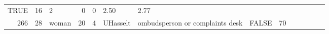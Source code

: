 \documentclass[]{svmono}
\theoremstyle{definition}
\theoremstyle{definition}
\theoremstyle{definition}
\theoremstyle{remark}
\begin{document}
\begin{longtable}[]{@{}rrlrrlllrrrrrr@{}}
\begin{minipage}[t]{0.04\columnwidth}
TRUE\strut
\end{minipage} & \begin{minipage}[t]{0.02\columnwidth}\raggedleft\strut
16\strut
\end{minipage} & \begin{minipage}[t]{0.03\columnwidth}\raggedleft\strut
2\strut
\end{minipage} & \begin{minipage}[t]{0.05\columnwidth}\raggedleft\strut
0\strut
\end{minipage} & \begin{minipage}[t]{0.06\columnwidth}\raggedleft\strut
0\strut
\end{minipage} & \begin{minipage}[t]{0.04\columnwidth}\raggedleft\strut
2.50\strut
\end{minipage} & \begin{minipage}[t]{0.03\columnwidth}\raggedleft\strut
2.77\strut
\end{minipage}\tabularnewline
\begin{minipage}[t]{0.02\columnwidth}\raggedleft\strut
266\strut
\end{minipage} & \begin{minipage}[t]{0.03\columnwidth}\raggedleft\strut
28\strut
\end{minipage} & \begin{minipage}[t]{0.03\columnwidth}\raggedright\strut
woman\strut
\end{minipage} & \begin{minipage}[t]{0.02\columnwidth}\raggedleft\strut
20\strut
\end{minipage} & \begin{minipage}[t]{0.03\columnwidth}\raggedleft\strut
4\strut
\end{minipage} & \begin{minipage}[t]{0.09\columnwidth}\raggedright\strut
UHasselt\strut
\end{minipage} & \begin{minipage}[t]{0.14\columnwidth}\raggedright\strut
ombudsperson or complaints desk\strut
\end{minipage} & \begin{minipage}[t]{0.04\columnwidth}\raggedright\strut
FALSE\strut
\end{minipage} & \begin{minipage}[t]{0.02\columnwidth}\raggedleft\strut
70\strut
\end{minipage} & \begin{minipage}[t]{0.03\columnwidth}\raggedleft\strut

\end{minipage}
\end{longtable}
\end{document}
